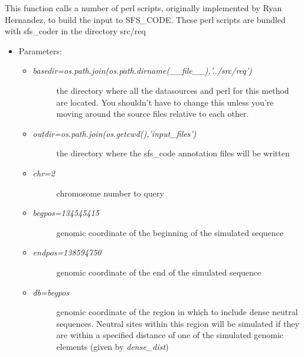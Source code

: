 \documentclass[letterpaper,10pt,english]{sphinxmanual}
\begin{document}
\begin{fulllineitems}
\begin{fulllineitems}
This function calls a number of perl scripts, originally 
implemented by Ryan Hernandez, to build the input to SFS\_CODE.  These
perl scripts are bundled with sfs\_coder in the directory src/req
\begin{itemize}
\item {} 
Parameters:
\begin{itemize}
\item {} \begin{description}
\item[{\emph{basedir=os.path.join(os.path.dirname(\_\_file\_\_),'../src/req')}}] \leavevmode
the directory where all the datasources and perl for this method
are located.  You shouldn't have to change this unless you're
moving around the source files relative to each other.

\end{description}

\item {} \begin{description}
\item[{\emph{outdir=os.path.join(os.getcwd(),'input\_files')}}] \leavevmode
the directory where the sfs\_code annotation files will be 
written

\end{description}

\item {} \begin{description}
\item[{\emph{chr=2}}] \leavevmode
chromosome number to query

\end{description}

\item {} \begin{description}
\item[{\emph{begpos=134545415}}] \leavevmode
genomic coordinate of the beginning of the simulated sequence

\end{description}

\item {} \begin{description}
\item[{\emph{endpos=138594750}}] \leavevmode
genomic coordinate of the end of the simulated sequence

\end{description}

\item {} \begin{description}
\item[{\emph{db=begpos}}] \leavevmode
genomic coordinate of the region in which to include dense 
neutral sequences.  Neutral sites within this region will be 
simulated if they are within a specified distance of one
of the simulated genomic elements (given by \emph{dense\_dist})


\end{description}
\end{itemize}
\end{itemize}
\end{fulllineitems}
\end{fulllineitems}
\end{document}
